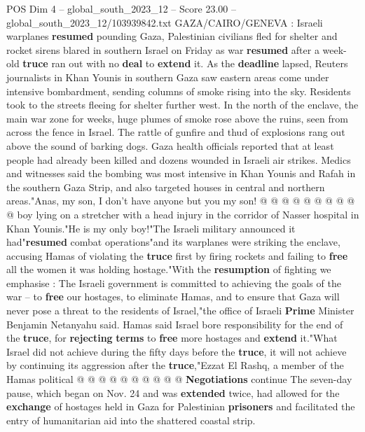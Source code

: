 \begin{textsample}{POS Dim 4 – global\_south\_2023\_12 – Score 23.00 – global\_south\_2023\_12/103939842.txt}  \label{ex:f4_pos_131}
GAZA/CAIRO/GENEVA : Israeli warplanes \textbf{resumed} pounding Gaza, Palestinian civilians fled for shelter and rocket sirens blared in southern Israel on Friday as war \textbf{resumed} after a week-old \textbf{truce} ran out with no \textbf{deal} to \textbf{extend} it.
As the \textbf{deadline} lapsed, Reuters journalists in Khan Younis in southern Gaza saw eastern areas come under intensive bombardment, sending columns of smoke rising into the sky.
Residents took to the streets fleeing for shelter further west.
In the north of the enclave, the main war zone for weeks, huge plumes of smoke rose above the ruins, seen from across the fence in Israel.
The rattle of gunfire and thud of explosions rang out above the sound of barking dogs.
Gaza health officials reported that at least people had already been killed and dozens wounded in Israeli air strikes.
Medics and witnesses said the bombing was most intensive in Khan Younis and Rafah in the southern Gaza Strip, and also targeted houses in central and northern areas."Anas, my son, I don't have anyone but you my son! @ @ @ @ @ @ @ @ @ @ boy lying on a stretcher with a head injury in the corridor of Nasser hospital in Khan Younis."He is my only boy!"The Israeli military announced it had"\textbf{resumed} combat operations"and its warplanes were striking the enclave, accusing Hamas of violating the \textbf{truce} first by firing rockets and failing to \textbf{free} all the women it was holding hostage."With the \textbf{resumption} of fighting we emphasise : The Israeli government is committed to achieving the goals of the war -- to \textbf{free} our hostages, to eliminate Hamas, and to ensure that Gaza will never pose a threat to the residents of Israel,"the office of Israeli \textbf{Prime} Minister Benjamin Netanyahu said.
Hamas said Israel bore responsibility for the end of the \textbf{truce}, for \textbf{rejecting} \textbf{terms} to \textbf{free} more hostages and \textbf{extend} it."What Israel did not achieve during the fifty days before the \textbf{truce}, it will not achieve by continuing its aggression after the \textbf{truce},"Ezzat El Rashq, a member of the Hamas political @ @ @ @ @ @ @ @ @ @ \textbf{Negotiations} continue The seven-day pause, which began on Nov. 24 and was \textbf{extended} twice, had allowed for the \textbf{exchange} of hostages held in Gaza for Palestinian \textbf{prisoners} and facilitated the entry of humanitarian aid into the shattered coastal strip.

\end{textsample}
